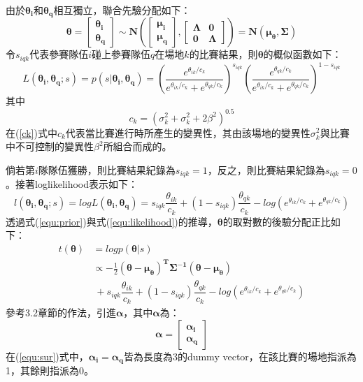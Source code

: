\documentclass[12pt]{article}
\begin{document}
由於$\boldsymbol{\theta_{i}}$和$\boldsymbol{\theta_q}$相互獨立，聯合先驗分配如下：
\begin{equation}
\boldsymbol{\theta = \begin{bmatrix}
\theta_i \\ \theta_q \end{bmatrix} \sim N\left(\begin{bmatrix}
\mu_i \\ \mu_q
\end{bmatrix},\begin{bmatrix}
\Lambda & 0 \\ 0 & \Lambda
\end{bmatrix}
\right) = N(\mu_{\theta},\Sigma)}
\label{equ:prior}
\end{equation}
令$s_{iqk}$代表參賽隊伍$i$碰上參賽隊伍$q$在場地$k$的比賽結果，則$\boldsymbol{\theta}$的概似函數如下：
\begin{equation}
L(\boldsymbol{\theta_i,\theta_q};s) = p(s|\boldsymbol{\theta_i,\theta_q}) =  ( \dfrac{e^{\theta_{ik}/c_k}}{e^{\theta_{ik}/c_k}+e^{\theta_{qk}/c_k}}) ^{s_{iqk}}(\dfrac{e^{\theta_{qk}/c_k}}{e^{\theta_{ik}/c_k}+e^{\theta_{qk}/c_k}}) ^{1-s_{iqk}}
\end{equation}
其中
\begin{equation}
c_k = (\sigma^2_k + \sigma^2_k + 2 \beta^2)^{0.5}
\label{ck}
\end{equation}
在(\ref{ck})式中$c_k$代表當比賽進行時所產生的變異性，其由該場地的變異性$\sigma^2_k$與比賽中不可控制的變異性$\beta^2$所組合而成的。

倘若第$i$隊隊伍獲勝，則比賽結果紀錄為$s_{iqk} = 1$，反之，則比賽結果紀錄為$s_{iqk} = 0$。接著loglikelihood表示如下：
\begin{equation}
l(\boldsymbol{\theta_i,\theta_q};s) = log L(\boldsymbol{\theta_i,\theta_q}) = s_{iqk}\dfrac{\theta_{ik}}{c_k} + (1-s_{iqk})\dfrac{\theta_{qk}}{c_k} - log(e^{\theta_{ik}/c_k}+e^{\theta_{qk}/c_k})
\label{equ:likelihood}
\end{equation}
透過式(\ref{equ:prior})與式(\ref{equ:likelihood})的推導，$\boldsymbol{\theta}$的取對數的後驗分配正比如下：
\begin{equation}
\begin{aligned}
t(\boldsymbol{\theta})&=log p(\boldsymbol{\theta}|s)\\ 
&\propto -\frac{1}{2}\boldsymbol{(\theta-\mu_{\theta})^T \Sigma^{-1}(\theta-\mu_{\theta})}\\ &\    +s_{iqk}\dfrac{\theta_{ik}}{c_k}+ (1-s_{iqk})\dfrac{\theta_{qk}}{c_k} - log(e^{{\theta_{ik}}/{c_k}}+e^{{\theta_{qk}}/{c_k}})
\end{aligned}
\end{equation}
參考3.2章節的作法，引進$\boldsymbol{\alpha}$，其中$\boldsymbol{\alpha}$為：
\begin{equation}
\boldsymbol{\alpha} = \begin{bmatrix}
\boldsymbol{\alpha_i} \\ \boldsymbol{\alpha_q}
\end{bmatrix}
\label{equ:sur}
\end{equation}
在(\ref{equ:sur})式中，$\boldsymbol{\alpha_i = \alpha_q}$皆為長度為3的dummy vector，在該比賽的場地指派為1，其餘則指派為0。
\end{document}
